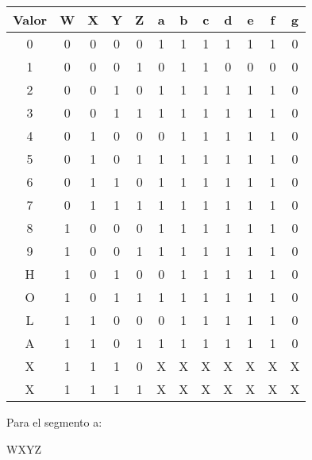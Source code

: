 


  \begin{center}
    \begin{tabular}{ c | c | c | c | c || c | c | c | c | c | c | c}
      Valor & W & X & Y & Z & a & b & c & d & e & f & g \\
      \toprule
      0 & 0 & 0 & 0 & 0 & 1 & 1 & 1 & 1 & 1 & 1 & 0 \\
      1 & 0 & 0 & 0 & 1 & 0 & 1 & 1 & 0 & 0 & 0 & 0 \\
      \midrule
      2 & 0 & 0 & 1 & 0 & 1 & 1 & 1 & 1 & 1 & 1 & 0 \\
      3 & 0 & 0 & 1 & 1 & 1 & 1 & 1 & 1 & 1 & 1 & 0 \\
      \midrule
      4 & 0 & 1 & 0 & 0 & 0 & 1 & 1 & 1 & 1 & 1 & 0 \\
      5 & 0 & 1 & 0 & 1 & 1 & 1 & 1 & 1 & 1 & 1 & 0 \\
      \midrule
      6 & 0 & 1 & 1 & 0 & 1 & 1 & 1 & 1 & 1 & 1 & 0 \\
      7 & 0 & 1 & 1 & 1 & 1 & 1 & 1 & 1 & 1 & 1 & 0 \\
      \midrule
      8 & 1 & 0 & 0 & 0 & 1 & 1 & 1 & 1 & 1 & 1 & 0 \\
      9 & 1 & 0 & 0 & 1 & 1 & 1 & 1 & 1 & 1 & 1 & 0 \\
      \midrule
      H & 1 & 0 & 1 & 0 & 0 & 1 & 1 & 1 & 1 & 1 & 0 \\
      O & 1 & 0 & 1 & 1 & 1 & 1 & 1 & 1 & 1 & 1 & 0 \\
      \midrule
      L & 1 & 1 & 0 & 0 & 0 & 1 & 1 & 1 & 1 & 1 & 0 \\
      A & 1 & 1 & 0 & 1 & 1 & 1 & 1 & 1 & 1 & 1 & 0 \\
      \midrule
      X & 1 & 1 & 1 & 0 & X & X & X & X & X & X & X \\
      X & 1 & 1 & 1 & 1 & X & X & X & X & X & X & X \\
      \bottomrule
    \end{tabular}
  \end{center}



  Para el segmento a:
  \begin{Karnaugh}{W}{X}{Y}{Z}
  \end{Karnaugh}
